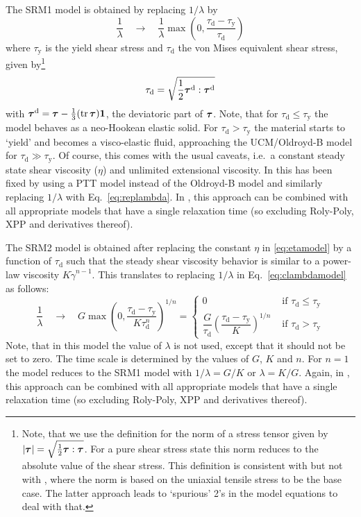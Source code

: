 The SRM1 model is obtained by replacing $1/\lambda$ by
\begin{equation}
      \dfrac1\lambda \quad\rightarrow\quad\dfrac1\lambda \max(0,\dfrac{\tau_\text{d}-\tau_\text{y}}{\tau_\text{d}}) \label{eq:replambda}
\end{equation}
where $\tau_\text{y}$ is the yield shear stress and $\tau_\text{d}$ the von Mises equivalent shear stress, given by\footnote{Note, that we use the definition for the norm of a stress tensor given by $|\boldsymbol{\tau}|=\sqrt{\frac12\boldsymbol{\tau}:\boldsymbol{\tau}}$. For a pure shear stress state this norm reduces to the absolute value of
 the shear stress. This definition is consistent with \cite{saramito_complex_2016,saramito_progress_2017} but not with \cite{saramito_new_2007,saramito_new_2009}, where the norm is based on the uniaxial tensile stress to be the base case. The latter approach leads to `spurious' 2's in the model equations to deal with that.}
\[
    \tau_\text{d} = \sqrt{\frac12\boldsymbol{\tau}^{\text{d}}:\boldsymbol{\tau}^{\text{d}}}
\]
with $\boldsymbol{\tau}^{\text{d}}=\boldsymbol{\tau}-\frac13(\operatorname{tr}\boldsymbol{\tau})\boldsymbol{1}$, the deviatoric part of $\boldsymbol{\tau}$. Note, that for $\tau_\text{d} \le \tau_\text{y}$ the model behaves as a neo-Hookean elastic solid. 
For $\tau_\text{d} > \tau_\text{y}$
the material starts to `yield' and becomes a visco-elastic fluid, approaching the UCM/Oldroyd-B model for $\tau_\text{d} \gg \tau_\text{y}$. Of course, this comes with the usual caveats, i.e.\ a constant steady state shear viscosity ($\eta$) and unlimited extensional viscosity. In \cite{saramito_new_2007} this has been fixed by using a PTT model instead of the Oldroyd-B model and similarly replacing $1/\lambda$ with Eq.~\eqref{eq:replambda}. In \tfem, this approach can be combined with all appropriate models that have a single relaxation time (so excluding Roly-Poly, XPP and derivatives thereof).

The SRM2 model is obtained after replacing the constant $\eta$ in \eqref{eq:etamodel} by a function of $\tau_\text{d}$ such that the steady shear viscosity behavior is similar to a power-law viscosity $K\dot\gamma^{n-1}$. 
This translates to replacing $1/\lambda$ in Eq.~\eqref{eq:clambdamodel} as follows:
\begin{equation}
      \dfrac1\lambda \quad\rightarrow\quad G\max(0,\dfrac{\tau_\text{d}-\tau_\text{y}}{K\tau_\text{d}^n})^{1/n}=    
\begin{cases}
     0 & \text{ if }\tau_\text{d} \le  \tau_\text{y} \\[1ex]
      \dfrac G{\tau_\text{d}}(\dfrac{\tau_\text{d}-\tau_\text{y}}{K})^{1/n} & \text{ if }\tau_\text{d} > \tau_\text{y} \label{eq:replambda2}
\end{cases}
\end{equation}
Note, that in this model the value of $\lambda$ is not used, except that it should not be set to zero. The time scale is determined by the values of $G$, $K$ and $n$. For $n=1$ the model reduces to the SRM1 model  with $1/\lambda=G/K$ or $\lambda=K/G$. 
Again, in \tfem, this approach can be combined with all appropriate models that have a single relaxation time (so excluding Roly-Poly, XPP and derivatives thereof).

